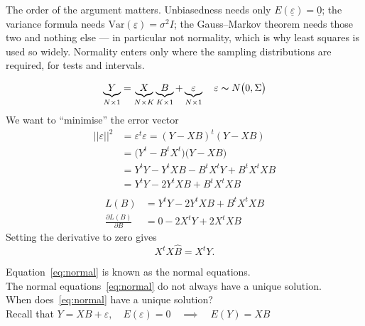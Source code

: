 \documentclass[11pt,a4paper]{article}
\theoremstyle{definition}
\begin{document}
The order of the argument matters. Unbiasedness needs only
$E\left(\underline{\varepsilon}\right)=\underline{0}$; the variance formula
needs $\text{Var}\left(\underline{\varepsilon}\right)=\sigma^2I$; the
Gauss--Markov theorem needs those two and nothing else --- in particular not
normality, which is why least squares is used so widely. Normality enters only
where the sampling distributions are required, for tests and intervals.

$$\underbrace{Y}_{N\times 1} = \underbrace{X}_{N\times K} \underbrace{B}_{K\times 1} + \underbrace{\varepsilon}_{N\times 1}\quad  \varepsilon \thicksim N\big(0,\Sigma\big)$$
We want to ``minimise'' the error vector
\begin{align*}
||\varepsilon||^2 & = \varepsilon^t\varepsilon = (Y-XB)^t(Y-XB)\\
                  & = \big(Y^t-B^tX^t\big)\big(Y-XB\big)\\
                  & = Y^tY-Y^tXB-B^tX^tY+B^tX^tXB\\
                  & = Y^tY-2Y^tXB+B^tX^tXB\\
\end{align*}
\begin{align*}
L(B) & = Y^tY-2Y^tXB+B^tX^tXB\\
\frac{\partial L(B)}{\partial B} & = 0-2X^tY+2X^tXB
\end{align*}
Setting the derivative to zero gives
\begin{equation}\label{eq:normal}
X^tX\widehat{B}=X^tY .
\end{equation}

Equation~\eqref{eq:normal} is known as the normal equations.\\

The normal equations~\eqref{eq:normal} do not always have a unique solution.\\

When does~\eqref{eq:normal} have a unique solution?\\

Recall that $Y=XB+\varepsilon,\quad  E(\varepsilon)=0\quad \implies \quad  E(Y)=XB$\\
\end{document}
